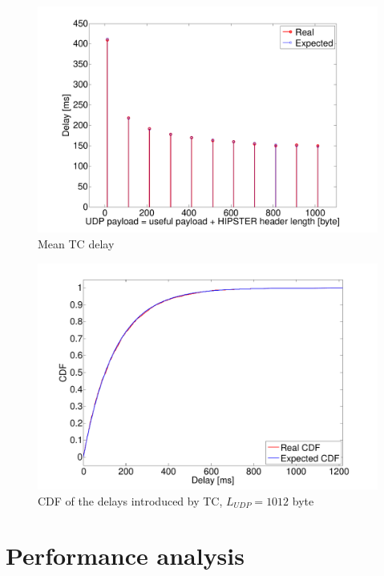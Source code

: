 \documentclass[10pt,twocolumn]{article}
\begin{document}
\begin{figure}[h]
  \centering
  \includegraphics[width=0.95\columnwidth, keepaspectratio]{tex/images/delayChannel.pdf}
  \caption{Mean TC delay}
  \label{fig:delay}
\end{figure}

\begin{figure}[htp]
  \centering
  \includegraphics[width = 0.95\columnwidth, keepaspectratio]{tex/images/cdfChannel.pdf}
  \caption{CDF of the delays introduced by TC, $L_{UDP} = 1012$ byte}
  \label{fig:CDF}
\end{figure}

\section{Performance analysis}
\end{document}
